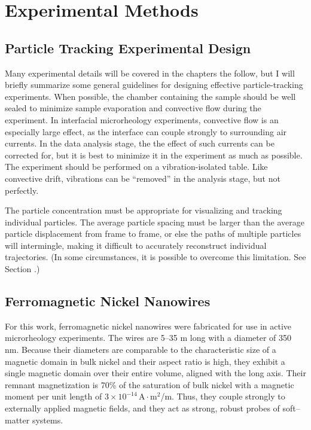 \chapter{\label{chap:methods}Experimental Methods}

\section{Particle Tracking Experimental Design}

Many experimental details will be covered in the chapters the follow, but I will briefly summarize some general guidelines for designing effective particle-tracking experiments. When possible, the chamber containing the sample should be well sealed to minimize sample evaporation and convective flow during the experiment\cite{Savin2005}. In interfacial microrheology experiments, convective flow is an especially large effect, as the interface can couple strongly to surrounding air currents. In the data analysis stage, the the effect of such currents can be corrected for\cite{Crocker2007}, but it is best to minimize it in the experiment as much as possible. The experiment should be performed on a vibration-isolated table. Like convective drift, vibrations can be ``removed'' in the analysis stage, but not perfectly. 

The particle concentration must be appropriate for visualizing and tracking individual particles. The average particle spacing must be larger than the average particle displacement from frame to frame, or else the paths of multiple particles will intermingle, making it difficult to accurately reconstruct individual trajectories\cite{Crocker1996}. (In some circumstances, it is possible to overcome this limitation. See Section \label{sec:prediction}.)

\section{Ferromagnetic Nickel Nanowires}

For this work, ferromagnetic nickel nanowires were fabricated for use in active microrheology experiments. The wires are 5--35 \textmu m long with a diameter of 350 nm. Because their diameters are comparable to the characteristic size of a magnetic domain in bulk nickel and their aspect ratio is high, they exhibit a single magnetic domain over their entire volume, aligned with the long axis. Their remnant magnetization is 70\% of the saturation of bulk nickel\cite{Sun1999} with a magnetic moment per unit length of $3 \times 10^{-14}\,\text{A}\cdot\text{m}^2$/\textmu m. Thus, they couple strongly to externally applied magnetic fields, and they act as strong, robust probes of soft--matter systems.

